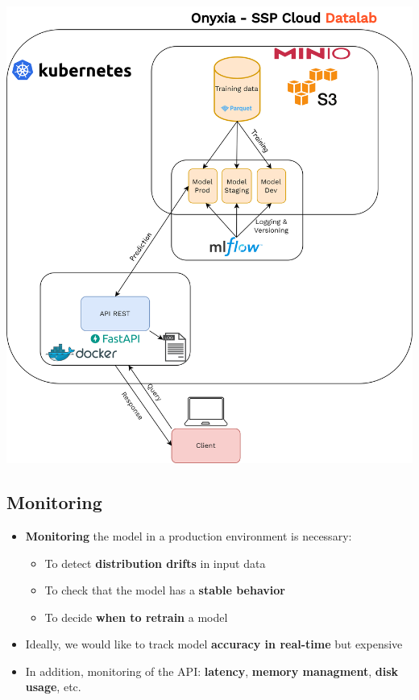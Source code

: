 \documentclass[
  letterpaper,
  DIV=11,
  numbers=noendperiod]{scrartcl}
\providecommand{\tightlist}{%
  \setlength{\itemsep}{0pt}\setlength{\parskip}{0pt}}\usepackage{longtable,booktabs,array}
\begin{document}
\begin{center}
\includegraphics{../img/api-datalab.png}
\end{center}

\subsection{Monitoring}\label{monitoring-3}

\begin{itemize}
\tightlist
\item
  {\textbf{Monitoring}} the model in a production environment is
  necessary:

  \begin{itemize}
  \tightlist
  \item
    To detect {\textbf{distribution drifts}} in input data
  \item
    To check that the model has a {\textbf{stable behavior}}
  \item
    To decide {\textbf{when to retrain}} a model
  \end{itemize}
\item
  Ideally, we would like to track model {\textbf{accuracy in real-time}}
  but expensive
\item
  In addition, monitoring of the API: {\textbf{latency}},
  {\textbf{memory managment}}, {\textbf{disk usage}}, etc.
\end{itemize}
\end{document}
